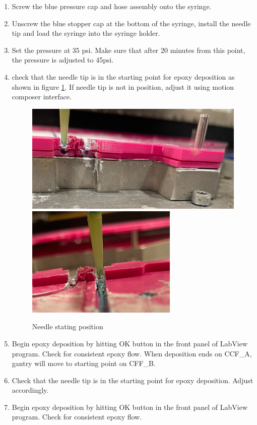 \documentclass[12pt]{cornelltfpxsop}
\begin{document}
\begin{paracol}{2}
\begin{enumerate}
        \item Screw the blue pressure cap and hose assembly onto the syringe.
        \item Unscrew the blue stopper cap at the bottom of the syringe, install the needle tip and load the syringe into the syringe holder.
        \item Set the pressure at 35 psi. Make sure that after 20 minutes from this point, the pressure is adjusted to 45psi.
        \item check that the needle tip is in the starting point for epoxy deposition as shown in figure \ref{needleref}. If needle tip is not in position, adjust it using motion composer interface.
        \begin{figure}[h!]
            \centering
            \includegraphics[width=0.45\linewidth]{img/NeedleRef.png}
            \includegraphics[width=0.45\linewidth]{img/NeedleRef2.png}
            \caption{Needle stating position}
            \label{needleref}
        \end{figure}
        \item Begin epoxy deposition by hitting OK button in the front panel of LabView program. Check for consistent epoxy flow. When deposition ends on CCF\_A, gantry will move to starting point on CFF\_B.  
        \item Check that the needle tip is in the starting point for epoxy deposition. Adjust accordingly. 
        \item Begin epoxy deposition by hitting OK button in the front panel of LabView program. Check for consistent epoxy flow.

\end{enumerate}
\end{paracol}
\end{document}
